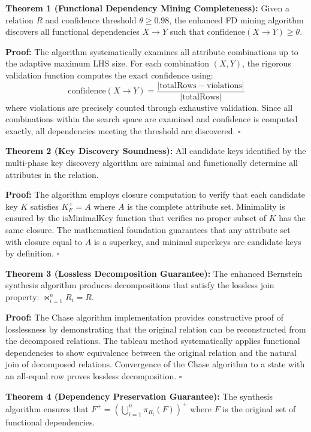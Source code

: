\documentclass[acmsmall]{acmart}
\begin{document}
\textbf{Theorem 1 (Functional Dependency Mining Completeness):} Given a relation $R$ and confidence threshold $\theta \geq 0.98$, the enhanced FD mining algorithm discovers all functional dependencies $X \to Y$ such that $\text{confidence}(X \to Y) \geq \theta$.

\textbf{Proof:} The algorithm systematically examines all attribute combinations up to the adaptive maximum LHS size. For each combination $(X, Y)$, the rigorous validation function computes the exact confidence using:
\begin{equation}
\text{confidence}(X \to Y) = \frac{|\text{totalRows} - \text{violations}|}{|\text{totalRows}|}
\end{equation}
where violations are precisely counted through exhaustive validation. Since all combinations within the search space are examined and confidence is computed exactly, all dependencies meeting the threshold are discovered. \hfill $\square$

\textbf{Theorem 2 (Key Discovery Soundness):} All candidate keys identified by the multi-phase key discovery algorithm are minimal and functionally determine all attributes in the relation.

\textbf{Proof:} The algorithm employs closure computation to verify that each candidate key $K$ satisfies $K^+_F = A$ where $A$ is the complete attribute set. Minimality is ensured by the isMinimalKey function that verifies no proper subset of $K$ has the same closure. The mathematical foundation guarantees that any attribute set with closure equal to $A$ is a superkey, and minimal superkeys are candidate keys by definition. \hfill $\square$

\textbf{Theorem 3 (Lossless Decomposition Guarantee):} The enhanced Bernstein synthesis algorithm produces decompositions that satisfy the lossless join property: $\bowtie_{i=1}^n R_i = R$.

\textbf{Proof:} The Chase algorithm implementation provides constructive proof of losslessness by demonstrating that the original relation can be reconstructed from the decomposed relations. The tableau method systematically applies functional dependencies to show equivalence between the original relation and the natural join of decomposed relations. Convergence of the Chase algorithm to a state with an all-equal row proves lossless decomposition. \hfill $\square$

\textbf{Theorem 4 (Dependency Preservation Guarantee):} The synthesis algorithm ensures that $F^+ = \left(\bigcup_{i=1}^n \pi_{R_i}(F)\right)^+$ where $F$ is the original set of functional dependencies.
\end{document}
